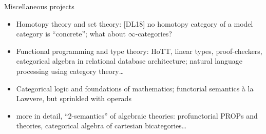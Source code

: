 \documentclass{beamer}
\begin{document}
%
%
%
%
%
%
%
\begin{frame}{Miscellaneous projects}
\small 
\begin{itemize}
  \item<+-> Homotopy theory and set theory: [\alert{DL18}] no homotopy category of a model category is ``concrete''; what about $\infty$-categories?
  \item<+-> Functional programming and type theory: HoTT, linear types, proof-checkers, categorical algebra in relational database architecture; natural language processing using category theory\dots
  \item<+-> Categorical logic and foundations of mathematics; functorial semantics à la Lawvere, but sprinkled with operads
  \item<+-> more in detail, ``2-semantics'' of algebraic theories: profunctorial PROPs and theories, categorical algebra of cartesian bicategories\dots
\end{itemize}
\end{frame}
%
\begin{frame}
  
\end{frame}
%
%
%
%
%
\end{document}
